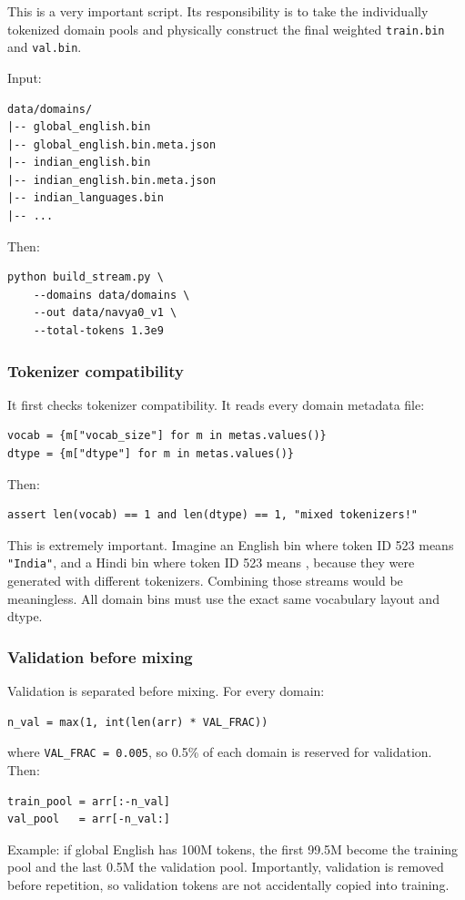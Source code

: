 This is a very important script. Its responsibility is to take the individually
tokenized domain pools and physically construct the final weighted
\texttt{train.bin} and \texttt{val.bin}.

Input:
\begin{lstlisting}[style=shadedpython,language={},basicstyle=\scriptsize\ttfamily]
data/domains/
|-- global_english.bin
|-- global_english.bin.meta.json
|-- indian_english.bin
|-- indian_english.bin.meta.json
|-- indian_languages.bin
|-- ...
\end{lstlisting}

Then:
\begin{lstlisting}[style=shadedpython]
python build_stream.py \
    --domains data/domains \
    --out data/navya0_v1 \
    --total-tokens 1.3e9
\end{lstlisting}

\subsubsection{Tokenizer compatibility}

It first checks tokenizer compatibility. It reads every domain metadata file:
\begin{lstlisting}[style=shadedpython]
vocab = {m["vocab_size"] for m in metas.values()}
dtype = {m["dtype"] for m in metas.values()}
\end{lstlisting}
Then:
\begin{lstlisting}[style=shadedpython]
assert len(vocab) == 1 and len(dtype) == 1, "mixed tokenizers!"
\end{lstlisting}
This is extremely important. Imagine an English bin where token ID 523 means
\texttt{"India"}, and a Hindi bin where token ID 523 means , because
they were generated with different tokenizers. Combining those streams would
be meaningless. All domain bins must use the exact same vocabulary layout and
dtype.

\subsubsection{Validation before mixing}

Validation is separated before mixing. For every domain:
\begin{lstlisting}[style=shadedpython]
n_val = max(1, int(len(arr) * VAL_FRAC))
\end{lstlisting}
where \texttt{VAL\_FRAC = 0.005}, so 0.5\% of each domain is reserved for
validation. Then:
\begin{lstlisting}[style=shadedpython]
train_pool = arr[:-n_val]
val_pool   = arr[-n_val:]
\end{lstlisting}
Example: if global English has 100M tokens, the first 99.5M become the
training pool and the last 0.5M the validation pool. Importantly, validation is
removed before repetition, so validation tokens are not accidentally copied
into training.

